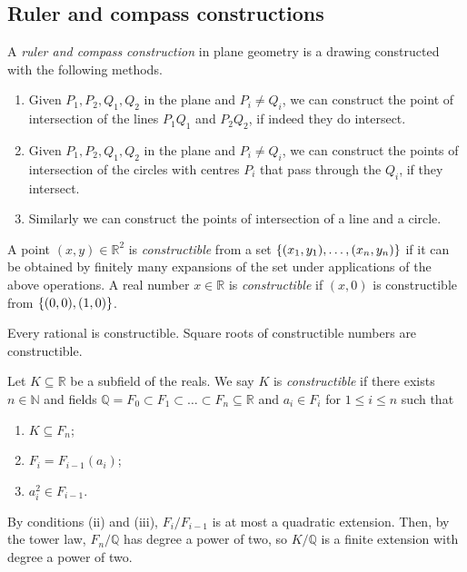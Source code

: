 \subsection{Ruler and compass constructions}
\begin{definition}
	A \emph{ruler and compass construction} in plane geometry is a drawing constructed with the following methods.
	\begin{enumerate}
		\item Given \( P_1, P_2, Q_1, Q_2 \) in the plane and \( P_i \neq Q_i \), we can construct the point of intersection of the lines \( P_1Q_1 \) and \( P_2Q_2 \), if indeed they do intersect.
		\item Given \( P_1, P_2, Q_1, Q_2 \) in the plane and \( P_i \neq Q_i \), we can construct the points of intersection of the circles with centres \( P_i \) that pass through the \( Q_i \), if they intersect.
		\item Similarly we can construct the points of intersection of a line and a circle.
	\end{enumerate}
	A point \( (x,y) \in \mathbb R^2 \) is \emph{constructible} from a set \( \qty{(x_1, y_1), \dots, (x_n, y_n)} \) if it can be obtained by finitely many expansions of the set under applications of the above operations.
	A real number \( x \in \mathbb R \) is \emph{constructible} if \( (x,0) \) is constructible from \( \qty{(0,0), (1,0)} \).
\end{definition}
\begin{remark}
	Every rational is constructible.
	Square roots of constructible numbers are constructible.
\end{remark}
\begin{definition}
	Let \( K \subseteq \mathbb R \) be a subfield of the reals.
	We say \( K \) is \emph{constructible} if there exists \( n \in \mathbb N \) and fields \( \mathbb Q = F_0 \subset F_1 \subset \dots \subset F_n \subseteq \mathbb R \) and \( a_i \in F_i \) for \( 1 \leq i \leq n \) such that
	\begin{enumerate}
		\item \( K \subseteq F_n \);
		\item \( F_i = F_{i-1}(a_i) \);
		\item \( a_i^2 \in F_{i-1} \).
	\end{enumerate}
\end{definition}
\begin{remark}
	By conditions (ii) and (iii), \( F_i / F_{i-1} \) is at most a quadratic extension.
	Then, by the tower law, \( F_n / \mathbb Q \) has degree a power of two, so \( K / \mathbb Q \) is a finite extension with degree a power of two.
\end{remark}
